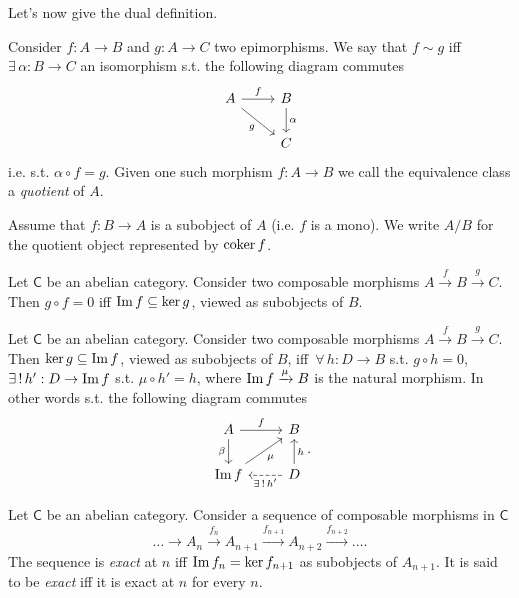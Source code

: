Let's now give the dual definition.
\begin{defn}[Quotient]
	Consider $f: A \to B$ and $g: A \to C$ two epimorphisms.
	We say that $f \sim g$ iff $\exists\, \alpha: B \to C$ an isomorphism s.t. the following diagram commutes
	\begin{equation}
	\begin{tikzcd}
		A \arrow[r, "f", rightarrow] \arrow[rd, "g"', rightarrow] &
		B \arrow[d, "\alpha", rightarrow] \\
		& C
	\end{tikzcd}
	\end{equation} 
	i.e. s.t. $\alpha \circ f = g$.
	Given one such morphism $f: A \to B$ we call the equivalence class a {\em quotient} of $A$.
\end{defn}
\begin{rem}[notation]
	Assume that $f: B \to A$ is a subobject of $A$ (i.e. $f$ is a mono).
	We write $A/B$ for the quotient object represented by $\operatorname{coker} f$.
\end{rem}

\begin{lem}
	Let $\mathsf{C}$ be an abelian category.
	Consider two composable morphisms $A \xrightarrow{f} B \xrightarrow{g} C$.
	Then $g \circ f = 0$ iff $\operatorname{Im} f \subseteq \ker g$, viewed as subobjects of $B$.
\end{lem} 

\begin{lem}
	Let $\mathsf{C}$ be an abelian category.
	Consider two composable morphisms $A \xrightarrow{f} B \xrightarrow{g} C$.
	Then $\ker g \subseteq \operatorname{Im} f$, viewed as subobjects of $B$, iff $\,\forall\, h: D \to B$ s.t.
	$g \circ h = 0$, $\exists\, !\, h': D \to \operatorname{Im} f$ s.t. $\mu \circ h' = h$, where $\operatorname{Im} f \xrightarrow{\mu} B$ is the natural morphism.
	In other words s.t. the following diagram commutes
	\begin{equation}
	\begin{tikzcd}
		A \arrow[r, "f", rightarrow] \arrow[d, "\beta"', rightarrow] &
		B\\
		\Ima f \arrow[ur, "\mu"', rightarrow] &
		D \arrow[u, "h"', rightarrow] \arrow[l, "\exists\, !\, h'", dashrightarrow] 
	\end{tikzcd}
	.\end{equation} 
\end{lem} 

\begin{defn}
	Let $\mathsf{C}$ be an abelian category.
	Consider a sequence of composable morphisms in $\mathsf{C}$
	\begin{equation}
	\ldots \to A_n \xrightarrow{f_n} 
	A_{n+1}  \xrightarrow{f_{n + 1}} 
	A_{n+2} \xrightarrow{f_{n + 2}} \ldots
	.\end{equation} 
	The sequence is {\em exact} at $n$ iff
	$\operatorname{Im} f_n = \ker f_{n+1}$ as subobjects of $A_{n + 1}$.
	It is said to be {\em exact} iff it is exact at $n$ for every $n$.
\end{defn}

